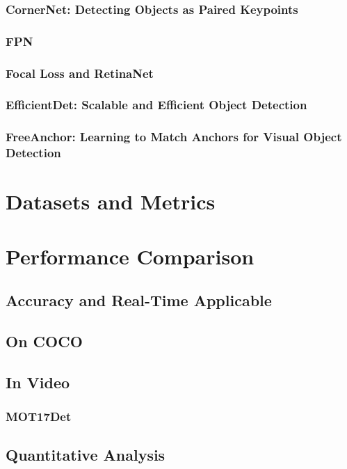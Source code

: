 \documentclass[12pt, oneside]{article}
\begin{document}
\subsubsection{CornerNet: Detecting Objects as Paired Keypoints}

\vfill

\subsubsection{FPN}

\subsubsection{Focal Loss and RetinaNet}

\vfill

\subsubsection{EfficientDet: Scalable and Efficient Object Detection}
\subsubsection{FreeAnchor: Learning to Match Anchors for Visual Object Detection}

\section{Datasets and Metrics}

\vfill

\section{Performance Comparison}
\subsection{Accuracy and Real-Time Applicable}
\subsection{On COCO}

\subsection{In Video}
\subsubsection{MOT17Det}

\subsection{Quantitative Analysis}
\end{document}
